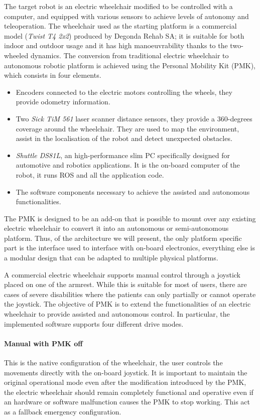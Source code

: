 The target robot is an electric wheelchair modified to be controlled with a computer, and equipped with various sensors to achieve levels of autonomy and teleoperation. The wheelchair used as the starting platform is a commercial model (\textit{Twist T4 2x2}) produced by Degonda Rehab SA; it is suitable for both indoor and outdoor usage and it has high manoeuvrability thanks to the two-wheeled dynamics. The conversion from traditional electric wheelchair to autonomous robotic platform is achieved using the Personal Mobility Kit (PMK), which consists in four elements.
\begin{itemize}
\item Encoders connected to the electric motors controlling the wheels, they provide odometry information.
\item Two \textit{Sick TiM 561} laser scanner distance sensors, they provide a 360-degrees coverage around the wheelchair. They are used to map the environment, assist in the localisation of the robot and detect unexpected obstacles.
\item \textit{Shuttle DS81L}, an high-performance slim PC specifically designed for automotive and robotics applications. It is the on-board computer of the robot, it runs ROS and all the application code.
\item The software components necessary to achieve the assisted and autonomous functionalities.
\end{itemize}
The PMK is designed to be an add-on that is possible to mount over any existing electric wheelchair to convert it into an autonomous or semi-autonomous platform. Thus, of the architecture we will present, the only platform specific part is the interface used to interface with on-board electronics, everything else is a modular design that can be adapted to multiple physical platforms.

A commercial electric wheelchair supports manual control through a joystick placed on one of the armrest. While this is suitable for most of users, there are cases of severe disabilities where the patients can only partially or cannot operate the joystick. The objective of PMK is to extend the functionalities of an electric wheelchair to provide assisted and autonomous control. In particular, the implemented software supports four different drive modes.

\paragraph{Manual with PMK off} This is the native configuration of the wheelchair, the user controls the movements directly with the on-board joystick. It is important to maintain the original operational mode even after the modification introduced by the PMK, the electric wheelchair should remain completely functional and operative even if an hardware or software malfunction causes the PMK to stop working. This act as a fallback emergency configuration.
